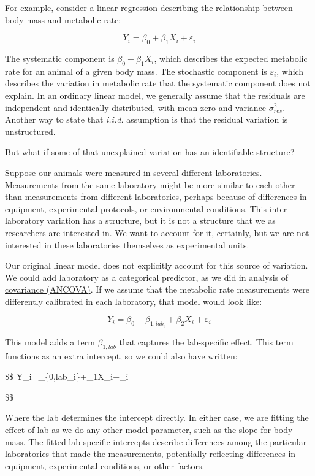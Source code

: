 \documentclass[
  13,
  letterpaper,
]{report}
\begin{document}
For example, consider a linear regression describing the relationship
between body mass and metabolic rate:

\[
Y_i=\beta_0+\beta_1X_i+\varepsilon_i
\]

The systematic component is \(\beta_0+\beta_1X_i\), which describes the
expected metabolic rate for an animal of a given body mass. The
stochastic component is \(\varepsilon_i\), which describes the variation
in metabolic rate that the systematic component does not explain. In an
ordinary linear model, we generally assume that the residuals are
independent and identically distributed, with mean zero and variance
\(\sigma^2_{res}\). Another way to state that \emph{i.i.d.} assumption
is that the residual variation is unstructured.

But what if some of that unexplained variation has an identifiable
structure?

Suppose our animals were measured in several different laboratories.
Measurements from the same laboratory might be more similar to each
other than measurements from different laboratories, perhaps because of
differences in equipment, experimental protocols, or environmental
conditions. This inter-laboratory variation has a structure, but it is
not a structure that we as researchers are interested in. We want to
account for it, certainly, but we are not interested in these
laboratories themselves as experimental units.

Our original linear model does not explicitly account for this source of
variation. We could add laboratory as a categorical predictor, as we did
in \hyperref[sec-linear-ancova]{analysis of covariance (ANCOVA)}. If we
assume that the metabolic rate measurements were differently calibrated
in each laboratory, that model would look like:

\[
Y_i=\beta_0+\beta_{1,lab_i}+\beta_2X_i+\varepsilon_i
\]

This model adds a term \(\beta_{1,lab}\) that captures the lab-specific
effect. This term functions as an extra intercept, so we could also have
written:

\$\$ Y\_i=\beta\_\{0,lab\_i\}+\beta\_1X\_i+\varepsilon\_i

\$\$

Where the lab determines the intercept directly. In either case, we are
fitting the effect of lab as we do any other model parameter, such as
the slope for body mass. The fitted lab-specific intercepts describe
differences among the particular laboratories that made the
measurements, potentially reflecting differences in equipment,
experimental conditions, or other factors.
\end{document}
